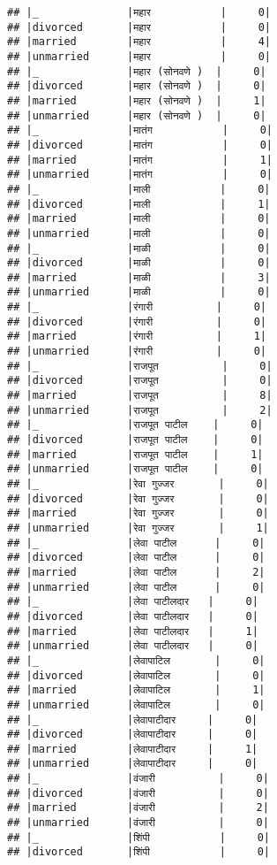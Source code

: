 \documentclass[
]{article}
\begin{document}
\begin{verbatim}
## |_              |महार           |     0|
## |divorced       |महार           |     0|
## |married        |महार           |     4|
## |unmarried      |महार           |     0|
## |_              |महार (सोनवणे )  |     0|
## |divorced       |महार (सोनवणे )  |     0|
## |married        |महार (सोनवणे )  |     1|
## |unmarried      |महार (सोनवणे )  |     0|
## |_              |मातंग           |     0|
## |divorced       |मातंग           |     0|
## |married        |मातंग           |     1|
## |unmarried      |मातंग           |     0|
## |_              |माली           |     0|
## |divorced       |माली           |     1|
## |married        |माली           |     0|
## |unmarried      |माली           |     0|
## |_              |माळी           |     0|
## |divorced       |माळी           |     0|
## |married        |माळी           |     3|
## |unmarried      |माळी           |     0|
## |_              |रंगारी          |     0|
## |divorced       |रंगारी          |     0|
## |married        |रंगारी          |     1|
## |unmarried      |रंगारी          |     0|
## |_              |राजपूत          |     0|
## |divorced       |राजपूत          |     0|
## |married        |राजपूत          |     8|
## |unmarried      |राजपूत          |     2|
## |_              |राजपूत पाटील    |     0|
## |divorced       |राजपूत पाटील    |     0|
## |married        |राजपूत पाटील    |     1|
## |unmarried      |राजपूत पाटील    |     0|
## |_              |रेवा गुज्जर       |     0|
## |divorced       |रेवा गुज्जर       |     0|
## |married        |रेवा गुज्जर       |     0|
## |unmarried      |रेवा गुज्जर       |     1|
## |_              |लेवा पाटील      |     0|
## |divorced       |लेवा पाटील      |     0|
## |married        |लेवा पाटील      |     2|
## |unmarried      |लेवा पाटील      |     0|
## |_              |लेवा पाटीलदार   |     0|
## |divorced       |लेवा पाटीलदार   |     0|
## |married        |लेवा पाटीलदार   |     1|
## |unmarried      |लेवा पाटीलदार   |     0|
## |_              |लेवापाटिल       |     0|
## |divorced       |लेवापाटिल       |     0|
## |married        |लेवापाटिल       |     1|
## |unmarried      |लेवापाटिल       |     0|
## |_              |लेवापाटीदार     |     0|
## |divorced       |लेवापाटीदार     |     0|
## |married        |लेवापाटीदार     |     1|
## |unmarried      |लेवापाटीदार     |     0|
## |_              |वंजारी          |     0|
## |divorced       |वंजारी          |     0|
## |married        |वंजारी          |     2|
## |unmarried      |वंजारी          |     0|
## |_              |शिंपी           |     0|
## |divorced       |शिंपी           |     0|

\end{verbatim}
\end{document}
